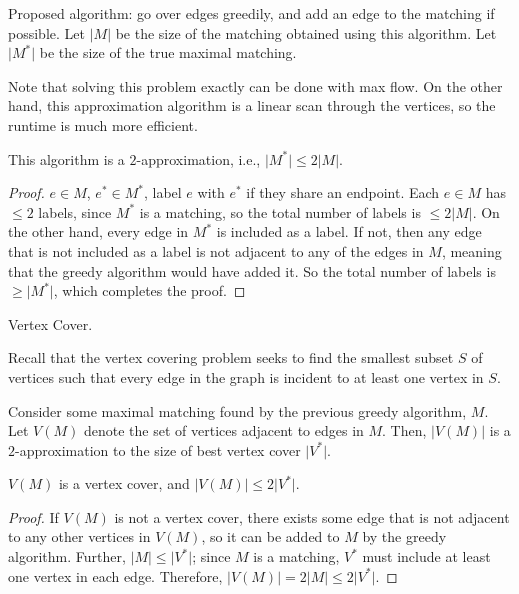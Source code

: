 Proposed algorithm: go over edges greedily, and add an edge to the matching if possible. Let $\vert M\vert$ be the size of the matching obtained using this algorithm. Let $\vert M^*\vert$ be the size of the true maximal matching. 

Note that solving this problem exactly can be done with max flow. On the other hand, this approximation algorithm is a linear scan through the vertices, so the runtime is much more efficient. 

\begin{theorem}
\claimlabel

This algorithm is a $2$-approximation, i.e., $\vert M^*\vert \leq 2\vert M\vert$. 
\end{theorem}

\begin{proof}
$e\in M$, $e^*\in M^*$, label $e$ with $e^*$ if they share an endpoint. Each $e\in M$ has $\leq 2$ labels, since $M^*$ is a matching, so the total number of labels is $\leq 2\vert M\vert$. On the other hand, every edge in $M^*$ is included as a label. If not, then any edge that is not included as a label is not adjacent to any of the edges in $M$, meaning that the greedy algorithm would have added it. So the total number of labels is $\geq \vert M^*\vert$, which completes the proof. 
\end{proof}

\begin{example}
\exlabel

Vertex Cover. 
\end{example}

Recall that the vertex covering problem seeks to find the smallest subset $S$ of vertices such that every edge in the graph is incident to at least one vertex in $S$. 

Consider some maximal matching found by the previous greedy algorithm, $M$. Let $V(M)$ denote the set of vertices adjacent to edges in $M$. Then, $\vert V(M)\vert$ is a $2$-approximation to the size of best vertex cover $\vert V^*\vert$. 

\begin{theorem}
\claimlabel

$V(M)$ is a vertex cover, and $\vert V(M)\vert \leq 2\vert V^*\vert$. 
\end{theorem}

\begin{proof}
If $V(M)$ is not a vertex cover, there exists some edge that is not adjacent to any other vertices in $V(M)$, so it can be added to $M$ by the greedy algorithm. Further, $\vert M\vert \leq \vert V^*\vert$; since $M$ is a matching, $V^*$ must include at least one vertex in each edge. Therefore, $\vert V(M)\vert = 2\vert M\vert\leq 2\vert V^*\vert$. 
\end{proof}

